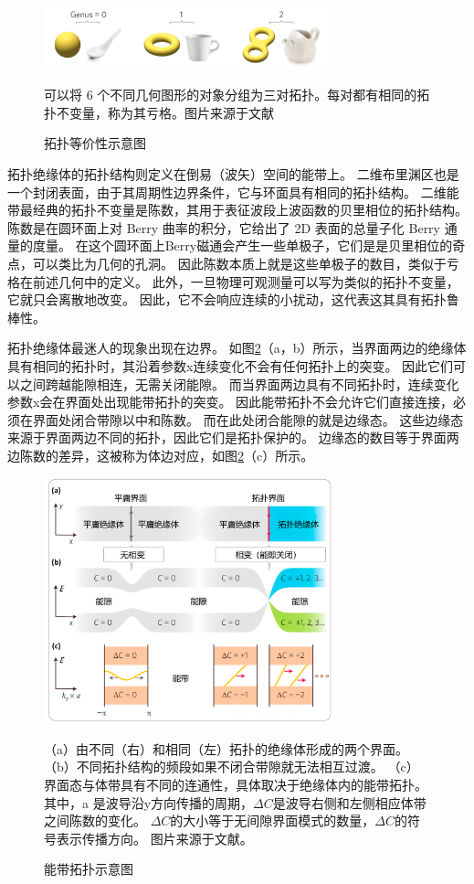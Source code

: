 \begin{figure}[htbp]
	\centering
	\includegraphics[width=0.75\textwidth]{figure/Introduction/TopoGeo.png}
 \caption{拓扑等价性示意图}可以将 6 个不同几何图形的对象分组为三对拓扑。每对都有相同的拓扑不变量，称为其亏格。图片来源于文献\cite{lu2014topological}
 \label{fig:TopoGeo}
\end{figure}

拓扑绝缘体的拓扑结构则定义在倒易（波矢）空间的能带上。
二维布里渊区也是一个封闭表面，由于其周期性边界条件，它与环面具有相同的拓扑结构。
二维能带最经典的拓扑不变量是陈数，其用于表征波段上波函数的贝里相位的拓扑结构。
陈数是在圆环面上对 Berry 曲率的积分，它给出了 2D 表面的总量子化 Berry 通量的度量。
在这个圆环面上Berry磁通会产生一些单极子，它们是是贝里相位的奇点，可以类比为几何的孔洞。
因此陈数本质上就是这些单极子的数目，类似于亏格在前述几何中的定义。
此外，一旦物理可观测量可以写为类似的拓扑不变量，它就只会离散地改变。
因此，它不会响应连续的小扰动，这代表这其具有拓扑鲁棒性。

拓扑绝缘体最迷人的现象出现在边界。
如图\ref{fig:TopoBand}（a，b）所示，当界面两边的绝缘体具有相同的拓扑时，其沿着参数x连续变化不会有任何拓扑上的突变。
因此它们可以之间跨越能隙相连，无需关闭能隙。
而当界面两边具有不同拓扑时，连续变化参数x会在界面处出现能带拓扑的突变。
因此能带拓扑不会允许它们直接连接，必须在界面处闭合带隙以中和陈数。
而在此处闭合能隙的就是边缘态。
这些边缘态来源于界面两边不同的拓扑，因此它们是拓扑保护的。
边缘态的数目等于界面两边陈数的差异，这被称为体边对应，如图\ref{fig:TopoBand}（c）所示。
\begin{figure}[htbp]
	\centering
	\includegraphics[width=0.75\textwidth]{figure/Introduction/TopoBand.jpg}
 \caption{能带拓扑示意图}
 （a）由不同（右）和相同（左）拓扑的绝缘体形成的两个界面。
（b）不同拓扑结构的频段如果不闭合带隙就无法相互过渡。
（c）界面态与体带具有不同的连通性，具体取决于绝缘体内的能带拓扑。
 其中，a 是波导沿y方向传播的周期，$\Delta C$是波导右侧和左侧相应体带之间陈数的变化。
 $\Delta C$的大小等于无间隙界面模式的数量，$\Delta C$的符号表示传播方向。
图片来源于文献\cite{lu2014topological}。
 \label{fig:TopoBand}
\end{figure}

